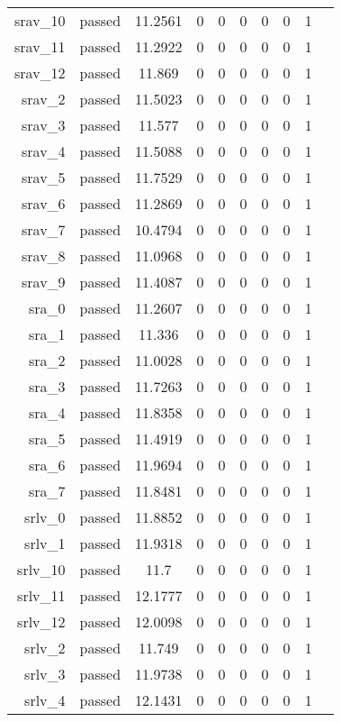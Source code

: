 \begin{longtable}{r|ccccccccc}
    srav\_10 & passed & 11.2561 & 0 & 0 & 0 & 0 & 0 & 1 \\
    srav\_11 & passed & 11.2922 & 0 & 0 & 0 & 0 & 0 & 1 \\
    srav\_12 & passed & 11.869 & 0 & 0 & 0 & 0 & 0 & 1 \\
    srav\_2 & passed & 11.5023 & 0 & 0 & 0 & 0 & 0 & 1 \\
    srav\_3 & passed & 11.577 & 0 & 0 & 0 & 0 & 0 & 1 \\
    srav\_4 & passed & 11.5088 & 0 & 0 & 0 & 0 & 0 & 1 \\
    srav\_5 & passed & 11.7529 & 0 & 0 & 0 & 0 & 0 & 1 \\
    srav\_6 & passed & 11.2869 & 0 & 0 & 0 & 0 & 0 & 1 \\
    srav\_7 & passed & 10.4794 & 0 & 0 & 0 & 0 & 0 & 1 \\
    srav\_8 & passed & 11.0968 & 0 & 0 & 0 & 0 & 0 & 1 \\
    srav\_9 & passed & 11.4087 & 0 & 0 & 0 & 0 & 0 & 1 \\
    sra\_0 & passed & 11.2607 & 0 & 0 & 0 & 0 & 0 & 1 \\
    sra\_1 & passed & 11.336 & 0 & 0 & 0 & 0 & 0 & 1 \\
    sra\_2 & passed & 11.0028 & 0 & 0 & 0 & 0 & 0 & 1 \\
    sra\_3 & passed & 11.7263 & 0 & 0 & 0 & 0 & 0 & 1 \\
    sra\_4 & passed & 11.8358 & 0 & 0 & 0 & 0 & 0 & 1 \\
    sra\_5 & passed & 11.4919 & 0 & 0 & 0 & 0 & 0 & 1 \\
    sra\_6 & passed & 11.9694 & 0 & 0 & 0 & 0 & 0 & 1 \\
    sra\_7 & passed & 11.8481 & 0 & 0 & 0 & 0 & 0 & 1 \\
    srlv\_0 & passed & 11.8852 & 0 & 0 & 0 & 0 & 0 & 1 \\
    srlv\_1 & passed & 11.9318 & 0 & 0 & 0 & 0 & 0 & 1 \\
    srlv\_10 & passed & 11.7 & 0 & 0 & 0 & 0 & 0 & 1 \\
    srlv\_11 & passed & 12.1777 & 0 & 0 & 0 & 0 & 0 & 1 \\
    srlv\_12 & passed & 12.0098 & 0 & 0 & 0 & 0 & 0 & 1 \\
    srlv\_2 & passed & 11.749 & 0 & 0 & 0 & 0 & 0 & 1 \\
    srlv\_3 & passed & 11.9738 & 0 & 0 & 0 & 0 & 0 & 1 \\
    srlv\_4 & passed & 12.1431 & 0 & 0 & 0 & 0 & 0 & 1 \\

\end{longtable}
